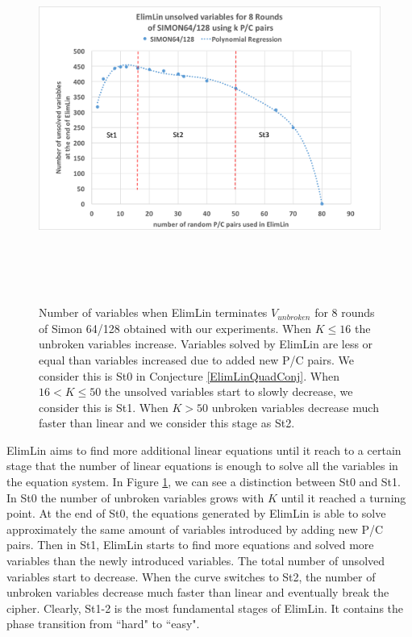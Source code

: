 \begin{figure}[h!]
	\vspace{-0.2cm}
	\centering
	\includegraphics*[width=140mm,height=12cm]{./pics/Test61.png}
	\caption[Number of variables when ElimLin terminates  $V_{unbroken}$
		for 8 rounds of Simon 64/128 obtained with our experiments.]{Number of variables when ElimLin terminates  $V_{unbroken}$
			for 8 rounds of Simon 64/128 obtained with our experiments.
		When $K \leq 16$ the unbroken variables increase. Variables solved by ElimLin are less or equal than variables increased due to added new P/C pairs. We consider this is St0 in
		Conjecture \ref{ElimLinQuadConj}. When $ 16 < K \leq 50 $ the unsolved variables start to slowly decrease, we consider this is St1. When $ K > 50 $ unbroken variables decrease much faster than linear and we consider this stage as St2.}
	\label{ElimLinUnrokenCurveUpDownSimon8}
	\vspace{-0.1cm}
\end{figure}

ElimLin aims to find more additional linear equations until it reach to a certain stage that the number of linear equations is enough to solve all the variables in the equation system. 
In Figure \ref{ElimLinUnrokenCurveUpDownSimon8}, we can see a distinction between St0 and St1. In St0 the number of unbroken variables grows with $K$ until it reached a turning point. At the end of St0, the equations generated by ElimLin is able to solve approximately the same amount of variables introduced by adding new P/C pairs. Then in St1, ElimLin starts to find more equations and solved more variables than the newly introduced variables. The total number of unsolved variables start to decrease.  When the curve switches to St2, the number of unbroken variables decrease much faster than linear and eventually break the cipher. Clearly, St1-2 is the most fundamental stages of ElimLin. It contains the phase transition from ``hard" to ``easy".

